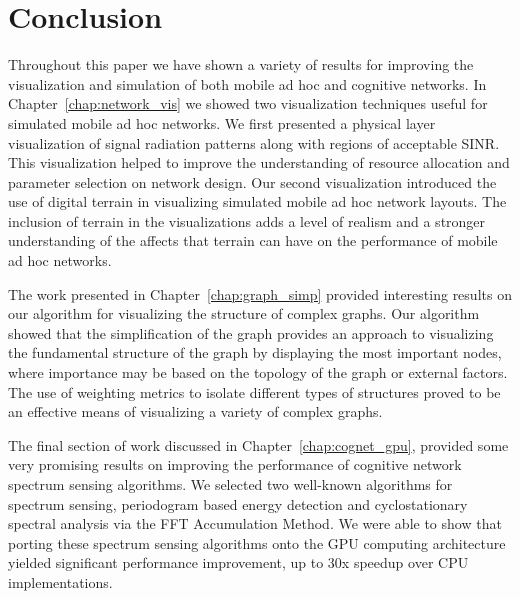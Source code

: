 \chapter{Conclusion}
\label{chap:conclusion}
Throughout this paper we have shown a variety of results for improving the visualization and simulation of both mobile ad hoc and cognitive networks.  In Chapter~\ref{chap:network_vis} we showed two visualization techniques useful for simulated mobile ad hoc networks.  We first presented a physical layer visualization of signal radiation patterns along with regions of acceptable SINR.  This visualization helped to improve the understanding of resource allocation and parameter selection on network design.  Our second visualization introduced the use of digital terrain in visualizing simulated mobile ad hoc network layouts.  The inclusion of terrain in the visualizations adds a level of realism and a stronger understanding of the affects that terrain can have on the performance of mobile ad hoc networks.

The work presented in Chapter~\ref{chap:graph_simp} provided interesting results on our algorithm for visualizing the structure of complex graphs.  Our algorithm showed that the simplification of the graph provides an approach to visualizing the fundamental structure of the graph by displaying the most important nodes, where importance may be based on the topology of the graph or external factors.  The use of weighting metrics to isolate different types of structures proved to be an effective means of visualizing a variety of complex graphs.

The final section of work discussed in Chapter~\ref{chap:cognet_gpu}, provided some very promising results on improving the performance of cognitive network spectrum sensing algorithms.  We selected two well-known algorithms for spectrum sensing, periodogram based energy detection and cyclostationary spectral analysis via the FFT Accumulation Method.  We were able to show that porting these spectrum sensing algorithms onto the GPU computing architecture yielded significant performance improvement, up to 30x speedup over CPU implementations.
